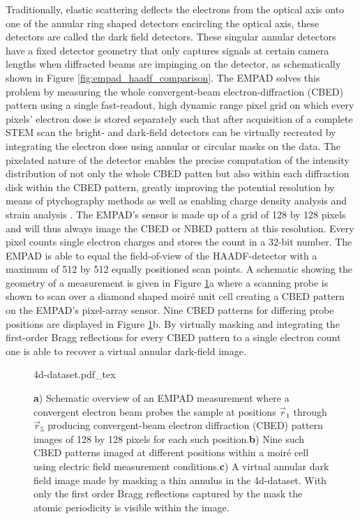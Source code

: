 Traditionally, elastic scattering deflects the electrons from the optical axis onto one of the annular ring shaped detectors encircling the optical axis, these detectors are called the dark field detectors. These singular annular detectors have a fixed detector geometry that only captures signals at certain camera lengths when diffracted beams are impinging on the detector, as schematically shown in Figure \ref{fig:empad_haadf_comparison}. The EMPAD solves this problem by measuring the whole convergent-beam electron-diffraction (CBED) pattern using a single fast-readout, high dynamic range pixel grid on which every pixels' electron dose is stored separately such that after acquisition of a complete STEM scan the bright- and dark-field detectors can be virtually recreated by integrating the electron dose using annular or circular masks on the data.
The pixelated nature of the detector enables the precise computation of the intensity distribution of not only the whole CBED patten but also within each diffraction disk within the CBED pattern, greatly improving the potential resolution by means of ptychography methods \cite{pennycookEfficientPhaseContrast2015, yangEfficientPhaseContrast2015a} as well as enabling charge density analysis \cite{hachtelSubAngstromElectricField2018,wenMapping1DConfined2022,fangAtomicElectrostaticMaps2019} and strain analysis \cite{hanStrainMappingTwoDimensional2018, ophusFourDimensionalScanningTransmission2019}.
The EMPAD's sensor is made up of a grid of 128 by 128 pixels and will thus always image the CBED or NBED pattern at this resolution. Every pixel counts single electron charges and stores the count in a 32-bit number. The EMPAD is able to equal the field-of-view of the HAADF-detector with a maximum of 512 by 512 equally positioned scan points. A schematic showing the geometry of a measurement is given in Figure \ref{fig:4d_dataset}a where a scanning probe is shown to scan over a diamond shaped moiré unit cell creating a CBED pattern on the EMPAD's pixel-array sensor. Nine CBED patterns for differing probe positions are displayed in Figure \ref{fig:4d_dataset}b. By virtually masking and integrating the first-order Bragg reflections for every CBED pattern to a single electron count one is able to recover a virtual annular dark-field image.

\begin{figure}[h]
	\centering
	\def\svgwidth{1\linewidth}
	{4d-dataset.pdf_tex}
    \caption{\textbf{a}) Schematic overview of an EMPAD measurement where a convergent electron beam probes the sample at positions $\vec{r}_1$ through $\vec{r}_5$ producing convergent-beam electron diffraction (CBED) pattern images of 128 by 128 pixels for each such position.\textbf{b}) Nine such CBED patterns imaged at different positions within a moiré cell using electric field measurement conditions.\textbf{c}) A virtual annular dark field image made by masking a thin annulus in the 4d-dataset. With only the first order Bragg reflections captured by the mask the atomic periodicity is visible within the image.}
	\label{fig:4d_dataset}
\end{figure}

